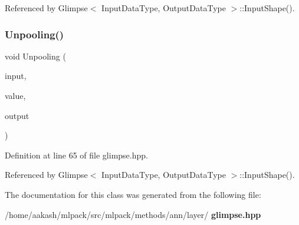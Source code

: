 Referenced by Glimpse$<$ Input\+Data\+Type, Output\+Data\+Type $>$\+::\+Input\+Shape().

\mbox{\label{classmlpack_1_1ann_1_1MeanPoolingRule_a6987ba7a159efff2732b4af9ba83f97a}} 
\subsubsection{Unpooling()}
{\footnotesize\ttfamily void Unpooling (\begin{DoxyParamCaption}\item[{const Mat\+Type \&}]{input,  }\item[{const double}]{value,  }\item[{Mat\+Type \&}]{output }\end{DoxyParamCaption})\hspace{0.3cm}{\ttfamily [inline]}}



Definition at line 65 of file glimpse.\+hpp.



Referenced by Glimpse$<$ Input\+Data\+Type, Output\+Data\+Type $>$\+::\+Input\+Shape().



The documentation for this class was generated from the following file\+:\begin{DoxyCompactItemize}
\item 
/home/aakash/mlpack/src/mlpack/methods/ann/layer/\textbf{ glimpse.\+hpp}\end{DoxyCompactItemize}
